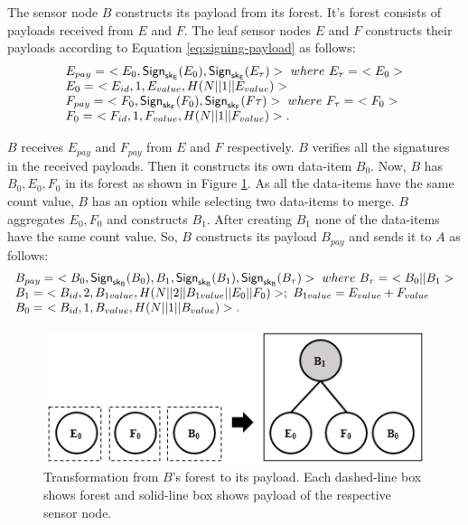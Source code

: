 	The sensor node $B$ constructs its payload from its forest. 
	It's forest consists of payloads received from $E$ and $F$.
	The leaf sensor nodes $E$ and $F$ constructs their payloads according to Equation \ref{eq:signing-payload} as follows:
	\begin{equation*}
		\begin{array}{l}
		E_{pay} =\ <E_{0}, \textsf{Sign}_{\sk_{E}}(E_{0}), \textsf{Sign}_{\sk_{E}}(E_{\tau}) >\ where\ E_{\tau} =\ <E_{0}>\\
		E_{0} =\ <E_{id}, 1, E_{value}, H(N||1||E_{value})>\\
		F_{pay} =\ <F_{0}, \textsf{Sign}_{\sk_{F}}(F_{0}), \textsf{Sign}_{\sk_{F}}(F{\tau}) >\ where\ F_{\tau} =\ <F_{0}>\\
		F_{0} =\ <F_{id}, 1, F_{value}, H(N||1||F_{value})>.
		\end{array}
	\end{equation*}
	
	$B$ receives $E_{pay}$ and $F_{pay}$ from $E$ and $F$ respectively. 
	$B$ verifies all the signatures in the received payloads.
	Then it constructs its own data-item $B_{0}$.
	Now, $B$ has $B_{0},E_{0},F_{0}$ in its forest as shown in Figure \ref{fig:b-forest-payload}. 
	As all the data-items have the same count value, $B$ has an option while selecting two data-items to merge.
	$B$ aggregates $E_{0},F_{0}$ and constructs $B_{1}$.
	After creating $B_{1}$ none of the data-items have the same count value. 
	So, $B$ constructs its payload $B_{pay}$ and sends it to $A$ as follows:
	\begin{equation*}
		\begin{array}{l}
			B_{pay} =\ < B_{0}, \textsf{Sign}_{\sf{sk}_{B}}(B_{0}), B_{1}, \textsf{Sign}_{\sf{sk}_{B}}(B_{1}), \textsf{Sign}_{\sf{sk}_{B}}(B_{\tau}) >\ where\ B_{\tau} =\ <B_{0} || B_{1}>\\
			B_{1} =\ < B_{id}, 2, B_{1value}, H(N||2||B_{1value}||E_{0}||F_{0})>;\ B_{1value} = E_{value} + F_{value} \\
			B_{0} =\ <B_{id}, 1, B_{value}, H(N||1||B_{value})>.
		\end{array}
		\label{eq:b-payload}
	\end{equation*}

	\begin{figure}[h!]
		\centering
		\includegraphics{images/b-forest-payload.png}
		\caption{Transformation from $B$'s forest to its payload.
				Each dashed-line box shows forest and solid-line box shows payload of the respective sensor node.}
		\label{fig:b-forest-payload}
	\end{figure}

